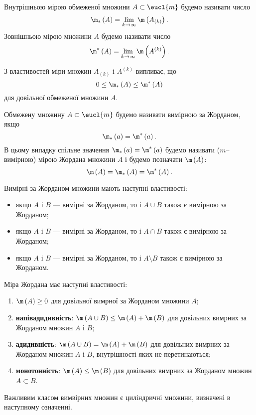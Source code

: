 \begin{definition}
Внутрішньою мірою обмеженої множини ${A\subset\eucl{m}}$ будемо називати число
\[
\m_{*}\left(A\right) = \lim\limits_{k\to\infty}\m\left(A_{(k)}\right).
\]
Зовнішньою мірою множини ${A}$ будемо називати число
\[
\m^{*}\left(A\right) = \lim\limits_{k\to\infty}\m\left(A^{(k)}\right).
\]
\end{definition}
З властивостей міри множин ${A_{(k)}}$ і ${A^{(k)}}$ випливає, що
\[
0 \leq \m_{*}\left(A\right) \leq \m^{*}\left(A\right)
\]
для довільної обмеженої множини $A$.
\begin{definition}
Обмежену множину ${A\subset\eucl{m}}$ будемо називати вимірною за Жорданом, якщо
\[
\m_{*}\left(a\right) = \m^{*}\left(a\right).
\]
В цьому випадку спільне значення ${\m_{*}\left(a\right) = \m^{*}\left(a\right)}$ будемо називати ($m$--вимірною) мірою Жордана множини $A$ і будемо позначати ${\m\left(A\right)}$:
\[
\m\left(A\right) =\m_{*}\left(A\right) = \m^{*}\left(A\right).
\]
\end{definition}
Вимірні за Жорданом множини мають наступні властивості:
\begin{itemize}
\item\label{prop:measrable_sets:1} якщо $A$ і $B$ --- вимірні за Жорданом, то і ${A\cup B}$ також є вимірною за Жорданом;
\item якщо $A$ і $B$ --- вимірні за Жорданом, то і ${A\cap B}$ також є вимірною за Жорданом;
\item якщо $A$ і $B$ --- вимірні за Жорданом, то і ${A\setminus B}$ також є вимірною за Жорданом.
\end{itemize}
Міра Жордана має наступні властивості:
\begin{enumerate}
\item ${\m\left(A\right)\geq 0}$ для довільної вимрної за Жорданом множини ${A}$;
\item {\bf напівадидивність}:
${\m\left(A\cup B\right) \leq \m\left(A\right) + \m\left(B\right)}$ для довільних вимрних за Жорданом множин ${A}$ і ${B}$;
\item {\bf адидивність}:
${\m\left(A\cup B\right) = \m\left(A\right) + \m\left(B\right)}$ для довільних вимрних за Жорданом множин ${A}$ і ${B}$, внутрішності яких не перетинаються;
\item {\bf монотонність}: ${\m\left(A\right)\leq \m\left(B\right)}$ для довільних вимрних за Жорданом множин ${A\subset B}$.
\end{enumerate}
Важливим класом вимвірних множин є циліндричні множини, визначені в наступному означенні.
